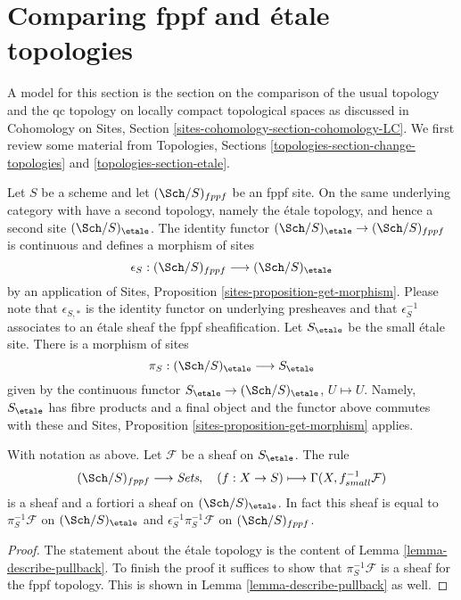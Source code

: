 \section{Comparing fppf and \'etale topologies}
\label{section-fppf-etale}

\noindent
A model for this section is the section on the comparison of the
usual topology and the qc topology on locally compact topological
spaces as discussed in Cohomology on Sites, Section
\ref{sites-cohomology-section-cohomology-LC}.
We first review some material from
Topologies, Sections
\ref{topologies-section-change-topologies} and
\ref{topologies-section-etale}.

\medskip\noindent
Let $S$ be a scheme and let $(\Sch/S)_{fppf}$ be an fppf site.
On the same underlying category with have a second topology,
namely the \'etale topology, and hence a second site
$(\Sch/S)_\etale$. The identity functor
$(\Sch/S)_\etale \to (\Sch/S)_{fppf}$ is continuous and defines
a morphism of sites
$$
\epsilon_S : (\Sch/S)_{fppf} \longrightarrow (\Sch/S)_\etale
$$
by an application of Sites, Proposition \ref{sites-proposition-get-morphism}.
Please note that $\epsilon_{S, *}$ is the identity functor on underlying
presheaves and that $\epsilon_S^{-1}$ associates to an \'etale sheaf the
fppf sheafification. Let $S_\etale$ be the small \'etale site.
There is a morphism of sites
$$
\pi_S : (\Sch/S)_\etale \longrightarrow S_\etale
$$
given by the continuous functor
$S_\etale \to (\Sch/S)_\etale$, $U \mapsto U$.
Namely, $S_\etale$ has fibre products and a final object and the
functor above commutes with these and
Sites, Proposition \ref{sites-proposition-get-morphism} applies.

\begin{lemma}
\label{lemma-describe-pullback-pi-fppf}
With notation as above.
Let $\mathcal{F}$ be a sheaf on $S_\etale$. The rule
$$
(\Sch/S)_{fppf} \longrightarrow \textit{Sets},\quad
(f : X \to S) \longmapsto \Gamma(X, f_{small}^{-1}\mathcal{F})
$$
is a sheaf and a fortiori a sheaf on $(\Sch/S)_\etale$.
In fact this sheaf is equal to
$\pi_S^{-1}\mathcal{F}$ on $(\Sch/S)_\etale$ and
$\epsilon_S^{-1}\pi_S^{-1}\mathcal{F}$ on $(\Sch/S)_{fppf}$.
\end{lemma}

\begin{proof}
The statement about the \'etale topology is the content
of Lemma \ref{lemma-describe-pullback}. To finish the proof it
suffices to show that $\pi_S^{-1}\mathcal{F}$ is a sheaf for the fppf
topology. This is shown in Lemma \ref{lemma-describe-pullback}
as well.
\end{proof}

